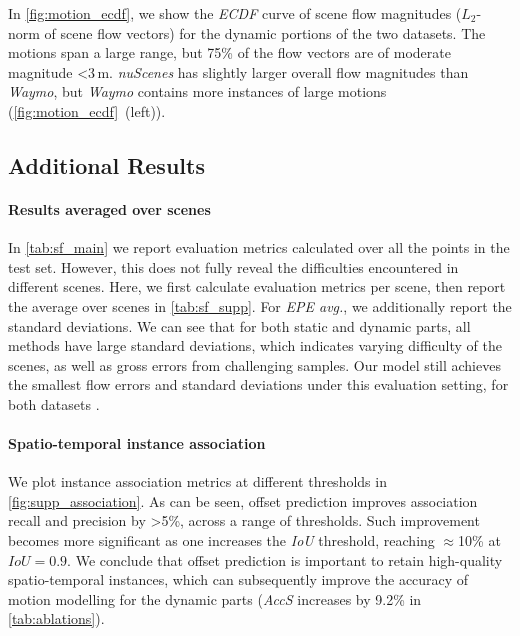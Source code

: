 In \cref{fig:motion_ecdf}, we show the \textit{ECDF} curve of scene flow magnitudes ($L_2$-norm of scene flow vectors) for the dynamic portions of the two datasets. The motions span a large range, but 75\% of the flow vectors are of moderate magnitude \textless3$\,$m. \emph{nuScenes} has slightly larger overall flow magnitudes than \emph{Waymo}, but \emph{Waymo} contains more instances of large motions (\cref{fig:motion_ecdf}~(left)).


\subsection{Additional Results}
\label{sec:supp_quan}
\paragraph{Results averaged over scenes}
In \cref{tab:sf_main} we report evaluation metrics calculated over all the points in the test set. However, this does not fully reveal the difficulties encountered in different scenes. Here, we first calculate evaluation metrics per scene, then report the average over scenes in \cref{tab:sf_supp}. For \textit{EPE avg.}, we additionally report the standard deviations. We can see that for both static and dynamic parts, all methods have large standard deviations, which indicates varying difficulty of the scenes, as well as gross errors from challenging samples. Our model still achieves the smallest flow errors and standard deviations under this evaluation setting, for both datasets . 


\paragraph{Spatio-temporal instance association}

We plot instance association metrics at different thresholds in \cref{fig:supp_association}. As can be seen, offset prediction improves association recall and precision by \textgreater5\%, across a range of thresholds. Such improvement becomes more significant as one increases the \textit{IoU} threshold, reaching $\approx$10\% at $IoU=0.9$. We conclude that offset prediction is important to retain high-quality spatio-temporal instances, which can subsequently improve the accuracy of motion modelling for the dynamic parts (\textit{AccS} increases by 9.2\%  in \cref{tab:ablations}).



